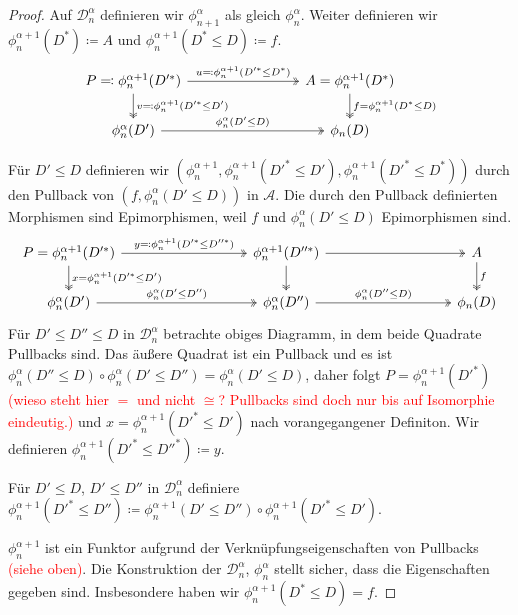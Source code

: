 \documentclass[a4paper, parskip=half]{scrartcl}
\theoremstyle{marginbreak}
\theoremstyle{nonumberplain}
\newtheorem{proof}{Beweis.}
\newcommand\cat\mathcal
\newcommand{\n}{\pgfmatrixnextcell}
\begin{document}
{\begin{proof}
			Auf $\cat{D}_n^\alpha$ definieren wir $\phi_{n+1}^\alpha$ als gleich
			$\phi_n^\alpha$. Weiter definieren wir $\phi_n^{\alpha+1}(D^*)\coloneqq A$
			und $\phi_n^{\alpha+1}(D^*\leq D)\coloneqq f$.
			\[
				\begin{tikzcd}[column sep=8em]
					P \eqqcolon \phi_n^{\alpha+1}(D'^*)
						\ar[two heads]{d}{v\eqqcolon \phi_n^{\alpha + 1}(D'^*\leq D')}
						\ar[two heads]{r}{u\eqqcolon \phi_n^{\alpha+1}(D'^*\leq D^*)}
					\n A=\phi_n^{\alpha+1}(D^*)
						\ar[two heads]{d}{f = \phi_n^{\alpha+1}(D^*\leq D)}\\
					\phi_n^\alpha(D') \ar[two heads]{r}{\phi_n^\alpha(D'\leq D)} \n \phi_n(D)
				\end{tikzcd}
			\]

			Für $D'\leq D$ definieren wir $(\phi_n^{\alpha+1}, \phi_n^{\alpha+1}(D'^*\leq D'),
			\phi_n^{\alpha+1}(D'^*\leq D^*))$ durch den Pullback
			von $(f, \phi_n^\alpha(D'\leq D))$ in $\cat{A}$. Die durch den Pullback
			definierten Morphismen sind Epimorphismen, weil $f$ und $\phi_n^\alpha(D'\leq D)$
			Epimorphismen sind.
			\[
				\begin{tikzcd}[column sep=9em]
					P=\phi_n^{\alpha+1}(D'^*)
						\ar[two heads]{d}{x=\phi_n^{\alpha+1}(D'^*\leq D')}
						\ar[two heads]{r}{y\eqqcolon \phi_n^{\alpha+1}(D'^*\leq D''^*)} \n
					\phi_n^{\alpha+1}(D''^*)
						\ar[two heads]{d}{}
						\ar[two heads]{r}{} \n
					A
						\ar[two heads]{d}{f} \\
					\phi_n^\alpha(D')
						\ar[two heads]{r}{\phi_n^\alpha(D'\leq D'')} \n
					\phi_n^\alpha(D'')
						\ar[two heads]{r}{\phi_n^\alpha(D''\leq D)} \n
					\phi_n(D)
				\end{tikzcd}
			\]
			Für $D'\leq D''\leq D$ in $\cat{D}_n^\alpha$ betrachte obiges Diagramm,
			in dem beide Quadrate Pullbacks sind. Das äußere Quadrat ist ein Pullback
			und es ist $\phi_n^\alpha(D''\leq D)\circ\phi_n^\alpha(D'\leq D'')=\phi_n^\alpha(D'\leq D)$,
			daher folgt $P=\phi_n^{\alpha+1}(D'^*)$
			\textcolor{red}{(wieso steht hier $=$ und nicht $\cong$? Pullbacks sind doch nur
			bis auf Isomorphie eindeutig.)}
			und $x=\phi_n^{\alpha+1}(D'^*\leq D')$
			nach vorangegangener Definiton. Wir definieren $\phi_n^{\alpha+1}(D'^*\leq D''^*)\coloneqq y$.

			Für $D'\leq D$, $D'\leq D''$ in $\cat{D}_n^\alpha$ definiere
			$\phi_n^{\alpha+1}(D'^*\leq D'')\coloneqq \phi_n^{\alpha+1}(D'\leq D'')
			\circ\phi_n^{\alpha+1}(D'^*\leq D')$.

			$\phi_n^{\alpha+1}$ ist ein Funktor aufgrund der Verknüpfungseigenschaften
			von Pullbacks \textcolor{red}{(siehe oben)}.
			Die Konstruktion der $\cat{D}_n^\alpha$, $\phi_n^\alpha$ stellt sicher,
			dass die Eigenschaften gegeben sind. Insbesondere haben wir
			$\phi_n^{\alpha+1}(D^*\leq D)=f$.


\end{proof}}
\end{document}
